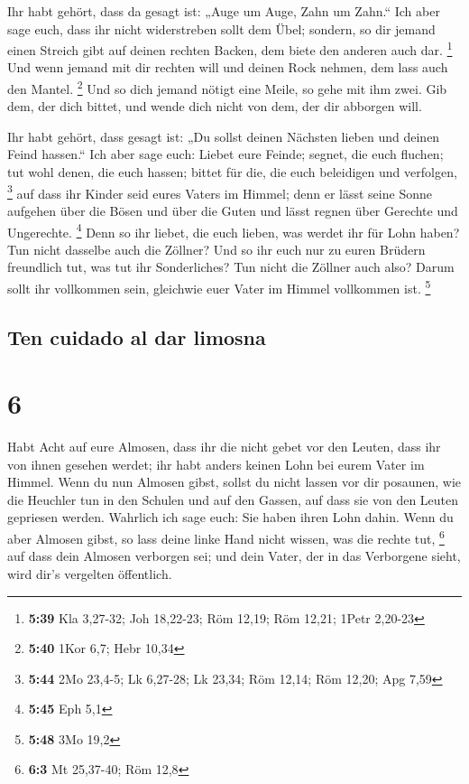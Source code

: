  Ihr habt gehört, dass da gesagt ist: „Auge um Auge, Zahn
um Zahn.``  Ich aber sage euch, dass ihr nicht
widerstreben sollt dem Übel; sondern, so dir jemand einen Streich gibt
auf deinen rechten Backen, dem biete den anderen auch dar. \footnote{\textbf{5:39}
  Kla 3,27-32; Joh 18,22-23; Röm 12,19; Röm 12,21; 1Petr 2,20-23}
 Und wenn jemand mit dir rechten will und deinen Rock
nehmen, dem lass auch den Mantel. \footnote{\textbf{5:40} 1Kor 6,7; Hebr
  10,34}  Und so dich jemand nötigt eine Meile, so gehe
mit ihm zwei.  Gib dem, der dich bittet, und wende dich
nicht von dem, der dir abborgen will.

 Ihr habt gehört, dass gesagt ist: „Du sollst deinen
Nächsten lieben und deinen Feind hassen.``  Ich aber sage
euch: Liebet eure Feinde; segnet, die euch fluchen; tut wohl denen, die
euch hassen; bittet für die, die euch beleidigen und verfolgen,
\footnote{\textbf{5:44} 2Mo 23,4-5; Lk 6,27-28; Lk 23,34; Röm 12,14; Röm
  12,20; Apg 7,59}  auf dass ihr Kinder seid eures Vaters
im Himmel; denn er lässt seine Sonne aufgehen über die Bösen und über
die Guten und lässt regnen über Gerechte und Ungerechte. \footnote{\textbf{5:45}
  Eph 5,1}  Denn so ihr liebet, die euch lieben, was
werdet ihr für Lohn haben? Tun nicht dasselbe auch die Zöllner?
 Und so ihr euch nur zu euren Brüdern freundlich tut, was
tut ihr Sonderliches? Tun nicht die Zöllner auch also? 
Darum sollt ihr vollkommen sein, gleichwie euer Vater im Himmel
vollkommen ist. \footnote{\textbf{5:48} 3Mo 19,2}

\hypertarget{ten-cuidado-al-dar-limosna}{%
\subsection{Ten cuidado al dar
limosna}\label{ten-cuidado-al-dar-limosna}}

\hypertarget{section-5}{%
\section{6}\label{section-5}}

 Habt Acht auf eure Almosen, dass ihr die nicht gebet vor
den Leuten, dass ihr von ihnen gesehen werdet; ihr habt anders keinen
Lohn bei eurem Vater im Himmel.  Wenn du nun Almosen
gibst, sollst du nicht lassen vor dir posaunen, wie die Heuchler tun in
den Schulen und auf den Gassen, auf dass sie von den Leuten gepriesen
werden. Wahrlich ich sage euch: Sie haben ihren Lohn dahin.
 Wenn du aber Almosen gibst, so lass deine linke Hand
nicht wissen, was die rechte tut, \footnote{\textbf{6:3} Mt 25,37-40;
  Röm 12,8}  auf dass dein Almosen verborgen sei; und dein
Vater, der in das Verborgene sieht, wird dir's vergelten öffentlich.

